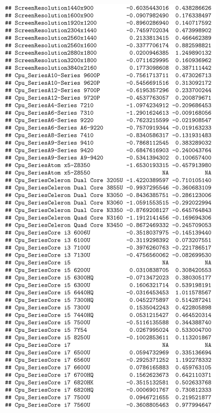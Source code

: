 \documentclass[12pt]{article}
\begin{document}
\begin{figure}[h!]
    \centering
    \includegraphics{Model_1_CI(2_5).png}
    \label{fig:CI12}
\end{figure}
\end{document}

